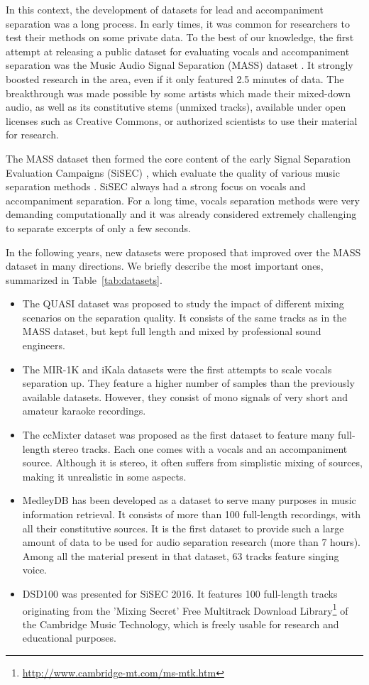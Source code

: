 In this context, the development of datasets for lead and accompaniment separation was a long process. In early times, it was common for researchers to test their methods on some private data. To the best of our knowledge, the first attempt at releasing a public dataset for evaluating vocals and accompaniment separation was the Music Audio Signal Separation (MASS) dataset \cite{MTGMASSdb}. %
It strongly boosted research in the area, even if it only featured 2.5 minutes of data. The breakthrough was made possible by some artists which made their mixed-down audio, as well as its constitutive stems (unmixed tracks), available under open licenses such as Creative Commons, or authorized scientists to use their material for research.

The MASS dataset then formed the core content of the early Signal Separation Evaluation Campaigns (SiSEC) \cite{vincent09}, which evaluate the quality of various music separation methods \cite{araki10,araki12,vincent12,ono15,liutkus17}. SiSEC always had a strong focus on vocals and accompaniment separation. For a long time, vocals separation methods were very demanding computationally and it was already considered extremely challenging to separate excerpts of only a few seconds.

In the following years, new datasets were proposed that improved over the MASS dataset in many directions. We briefly describe the most important ones, summarized in Table~\ref{tab:datasets}.
\begin{itemize}[leftmargin=*]
	\item The QUASI dataset was proposed to study the impact of different mixing scenarios on the separation quality. It  consists of the same tracks as in the MASS dataset, but kept full length and mixed by professional sound engineers.
	\item The MIR-1K and iKala datasets were the first attempts to scale vocals separation up. They feature a higher number of samples than the previously available datasets. However, they consist of mono signals of very short and amateur karaoke recordings.
	\item The ccMixter dataset was proposed as the first dataset to feature many full-length stereo tracks. Each one comes with a vocals and an accompaniment source. Although it is stereo, it often suffers from simplistic mixing of sources, making it unrealistic in some aspects.
	\item MedleyDB has been developed as a dataset to serve many purposes in music information retrieval. It consists of more than 100 full-length recordings, with all their constitutive sources. It is the first dataset to provide such a large amount of data to be used for audio separation research (more than 7 hours). Among all the material present in that dataset, 63 tracks feature singing voice.
  \item DSD100 was presented for SiSEC 2016. It features 100 full-length tracks originating from the 'Mixing Secret' Free Multitrack Download Library\footnote{\url{http://www.cambridge-mt.com/ms-mtk.htm}} of the Cambridge Music Technology, which is freely usable for research and educational purposes.
\end{itemize}

